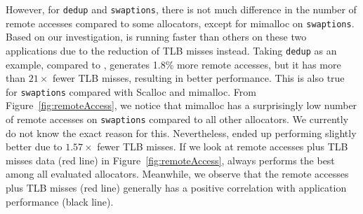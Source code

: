 However, for \texttt{dedup} and \texttt{swaptions}, there is not much difference in the number of remote accesses compared to some allocators, except for mimalloc on \texttt{swaptions}.
Based on our investigation, \NM{} is running faster than others on these two applications due to the reduction of TLB misses instead. 
Taking \texttt{dedup} as an example, compared to \TN{}, \NM{} generates 1.8\% more remote accesses, but it has more than $21\times$ fewer TLB misses, resulting in better performance. This is also true for \texttt{swaptions} compared with Scalloc and mimalloc. From Figure~\ref{fig:remoteAccess}, we notice that mimalloc has a surprisingly low number of remote accesses on \texttt{swaptions} compared to all other allocators. We currently do not know the exact reason for 
this. Nevertheless, \NM{} ended up performing slightly better due to $1.57\times$ fewer TLB misses.
If we look at remote accesses plus TLB misses data (red line) in Figure~\ref{fig:remoteAccess}, \NM{} always performs the best among all evaluated allocators.
Meanwhile, we observe that the remote accesses plus TLB misses (red line) generally has a positive correlation with application performance (black line). 

